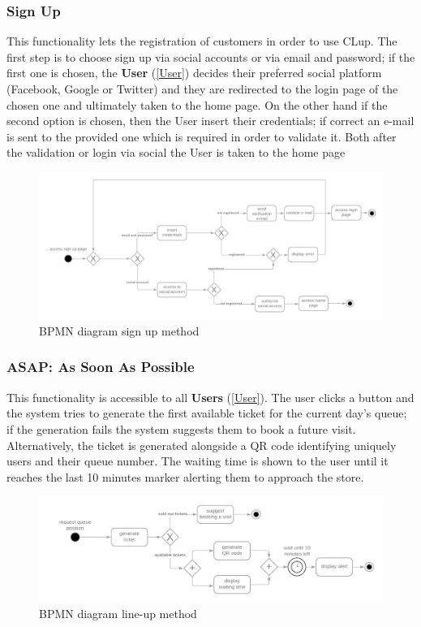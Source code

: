 \documentclass[table, 12pt]{article}
\begin{document}
\subsubsection{Sign Up}
\label{sign_up}
This functionality lets the registration of customers in order to use CLup. The first step is to choose sign up via social accounts or via email and password; if the first one is chosen, the \textbf{User} (\ref{User}) decides their preferred social platform (Facebook, Google or Twitter) and they are redirected to the login page of the chosen one and ultimately taken to the home page. On the other hand if the second option is chosen, then the User insert their credentials; if correct an e-mail is sent to the provided one which is required in order to validate it.
Both after the validation or login via social the User is taken to the home page
\begin{figure}[H]
    \begin{center}
        \includegraphics[width=\textwidth]{assets/Functions/function-sign-up.png}
        \caption{BPMN diagram sign up method}
    \end{center}
\end{figure}

\subsubsection{ASAP: As Soon As Possible}
\label{line_up}
This functionality is accessible to all \textbf{Users} (\ref{User}). The user clicks a button and the system tries to generate the first available ticket for the current day's queue; if the generation fails the system suggests them to book a future visit.
Alternatively, the ticket is generated alongside a QR code identifying uniquely users and their queue number. The waiting time is shown to the user until it reaches the last 10 minutes marker alerting them to approach the store.
\begin{figure}[H]
    \begin{center}
        \includegraphics[scale=0.25]{assets/Functions/function-line-up.png}
        \caption{BPMN diagram line-up method}
    \end{center}
\end{figure}
\end{document}
